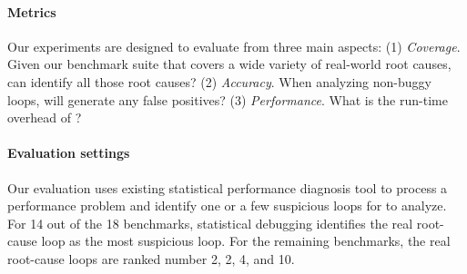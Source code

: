 \paragraph{Metrics}
Our experiments are designed to evaluate \Tool from three main aspects:
(1) 
\textit{Coverage}. Given our benchmark suite that covers a wide variety
of real-world root causes, can \Tool identify all those root causes?
(2)
\textit{Accuracy}. 
When analyzing non-buggy loops, will \Tool generate any false positives?
(3) 
\textit{Performance}.
What is the run-time overhead of \Tool?

\paragraph{Evaluation settings}
Our evaluation uses existing statistical performance diagnosis
tool \cite{SongOOPSLA2014} to process a performance problem and identify 
one or a few suspicious loops for \Tool to analyze.
For 14 out of the 18 benchmarks, statistical debugging identifies the
real root-cause loop as the most suspicious loop. For the remaining
benchmarks, the real root-cause loops are ranked number 2, 2, 4, and 10.

